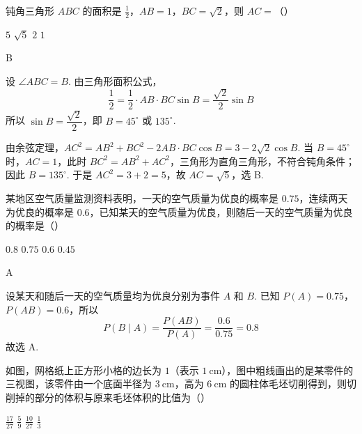 \begin{problem}
钝角三角形 \(ABC\) 的面积是 \(\frac{1}{2}\)，\(AB=1\)，\(BC=\sqrt{2}\)，则 \(AC=\)（\quad）

\choices
    {\(5\)}
    {\(\sqrt{5}\)}
    {\(2\)}
    {\(1\)}
\end{problem}

\begin{answer}
B
\end{answer}

\begin{solution}
设 \(\angle ABC=B\). 由三角形面积公式，
\[
\frac{1}{2}=\frac{1}{2}\cdot AB\cdot BC\sin B
 =\frac{\sqrt{2}}{2}\sin B
\]
所以 \(\sin B=\dfrac{\sqrt{2}}{2}\)，即 \(B=45^{\circ}\) 或 \(135^{\circ}\).

由余弦定理，\(AC^2=AB^2+BC^2-2AB\cdot BC\cos B=3-2\sqrt{2}\cos B\). 当 \(B=45^{\circ}\) 时，\(AC=1\)，此时 \(BC^2=AB^2+AC^2\)，三角形为直角三角形，不符合钝角条件；因此 \(B=135^{\circ}\). 于是 \(AC^2=3+2=5\)，故 \(AC=\sqrt{5}\)，选 B.
\end{solution}

\begin{problem}
某地区空气质量监测资料表明，一天的空气质量为优良的概率是 \(0.75\)，连续两天为优良的概率是 \(0.6\)，已知某天的空气质量为优良，则随后一天的空气质量为优良的概率是（\quad）

\choices
    {\(0.8\)}
    {\(0.75\)}
    {\(0.6\)}
    {\(0.45\)}
\end{problem}

\begin{answer}
A
\end{answer}

\begin{solution}
设某天和随后一天的空气质量均为优良分别为事件 \(A\) 和 \(B\). 已知 \(P(A)=0.75\)，\(P(AB)=0.6\)，所以
\[
P(B\mid A)=\frac{P(AB)}{P(A)}=\frac{0.6}{0.75}=0.8
\]
故选 A.
\end{solution}

\begin{problem}
如图，网格纸上正方形小格的边长为 \(1\)（表示 \(1\mathrm{~cm}\)），图中粗线画出的是某零件的三视图，该零件由一个底面半径为 \(3\mathrm{~cm}\)，高为 \(6\mathrm{~cm}\) 的圆柱体毛坯切削得到，则切削掉的部分的体积与原来毛坯体积的比值为（\quad）


\choices
    {\(\frac{17}{27}\)}
    {\(\frac{5}{9}\)}
    {\(\frac{10}{27}\)}
    {\(\frac{1}{3}\)}
\end{problem}


